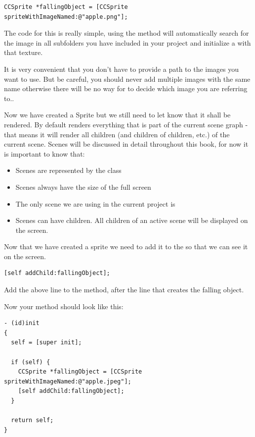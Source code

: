 \begin{lstlisting}
CCSprite *fallingObject = [CCSprite spriteWithImageNamed:@"apple.png"];
\end{lstlisting}

The code for this is really simple, using the 
method \cocos{} will automatically search for the image in all subfolders you
have included in your project and initialize a  with that
texture.
\begin{error}
It is very convenient that you don't have to provide a path to the images you
want to use. But be careful, you should never add multiple images with the same
name otherwise there will be no way for \cocos{} to decide which image you are
referring to..
\end{error}

Now we have created a Sprite but we still need to let \cocos{} know that it
shall be rendered. By default \cocos{} renders everything that is part of the
current scene graph - that means it will render all children (and children of
children, etc.) of the current scene. Scenes will be discussed in detail
throughout this book, for now it is important to know that:
\begin{itemize}
  \item Scenes are represented by the class 
  \item Scenes always have the size of the full screen
  \item The only scene we are using in the current project is
  \item Scenes can have children. All children of an active scene will be
  displayed on the screen.
\end{itemize}

Now that we have created a sprite we need to add it to the
 so that we can see it on the screen. 
\begin{lstlisting}
[self addChild:fallingObject];
\end{lstlisting}
Add the above line to the  method, after the line that creates
the falling object.

Now your  method should look like this:
\begin{lstlisting}
- (id)init
{
  self = [super init];
    
  if (self) {
    CCSprite *fallingObject = [CCSprite spriteWithImageNamed:@"apple.jpeg"];
    [self addChild:fallingObject];
  }
  
  return self;
}
\end{lstlisting} 
\inlinecode
